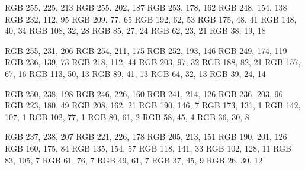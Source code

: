 

\definecolor{red-50}  {RGB} {255, 225, 213}
\definecolor{red-100} {RGB} {255, 202, 187}
\definecolor{red-150} {RGB} {253, 178, 162}
\definecolor{red-200} {RGB} {248, 154, 138}
\definecolor{red-300} {RGB} {232, 112, 95}
\definecolor{red-400} {RGB} {209, 77, 65}
\definecolor{red-500} {RGB} {192, 62, 53}
\definecolor{red-600} {RGB} {175, 48, 41}
\definecolor{red-700} {RGB} {148, 40, 34}
\definecolor{red-800} {RGB} {108, 32, 28}
\definecolor{red-850} {RGB} {85, 27, 24}
\definecolor{red-900} {RGB} {62, 23, 21}
\definecolor{red-950} {RGB} {38, 19, 18}

\definecolor{orange-50}  {RGB} {255, 231, 206}
\definecolor{orange-100} {RGB} {254, 211, 175}
\definecolor{orange-150} {RGB} {252, 193, 146}
\definecolor{orange-200} {RGB} {249, 174, 119}
\definecolor{orange-300} {RGB} {236, 139, 73}
\definecolor{orange-400} {RGB} {218, 112, 44}
\definecolor{orange-500} {RGB} {203, 97, 32}
\definecolor{orange-600} {RGB} {188, 82, 21}
\definecolor{orange-700} {RGB} {157, 67, 16}
\definecolor{orange-800} {RGB} {113, 50, 13}
\definecolor{orange-850} {RGB} {89, 41, 13}
\definecolor{orange-900} {RGB} {64, 32, 13}
\definecolor{orange-950} {RGB} {39, 24, 14}

\definecolor{yellow-50}  {RGB} {250, 238, 198}
\definecolor{yellow-100} {RGB} {246, 226, 160}
\definecolor{yellow-150} {RGB} {241, 214, 126}
\definecolor{yellow-200} {RGB} {236, 203, 96}
\definecolor{yellow-300} {RGB} {223, 180, 49}
\definecolor{yellow-400} {RGB} {208, 162, 21}
\definecolor{yellow-500} {RGB} {190, 146, 7}
\definecolor{yellow-600} {RGB} {173, 131, 1}
\definecolor{yellow-700} {RGB} {142, 107, 1}
\definecolor{yellow-800} {RGB} {102, 77, 1}
\definecolor{yellow-850} {RGB} {80, 61, 2}
\definecolor{yellow-900} {RGB} {58, 45, 4}
\definecolor{yellow-950} {RGB} {36, 30, 8}

\definecolor{green-50}  {RGB} {237, 238, 207}
\definecolor{green-100} {RGB} {221, 226, 178}
\definecolor{green-150} {RGB} {205, 213, 151}
\definecolor{green-200} {RGB} {190, 201, 126}
\definecolor{green-300} {RGB} {160, 175, 84}
\definecolor{green-400} {RGB} {135, 154, 57}
\definecolor{green-500} {RGB} {118, 141, 33}
\definecolor{green-600} {RGB} {102, 128, 11}
\definecolor{green-700} {RGB} {83, 105, 7}
\definecolor{green-800} {RGB} {61, 76, 7}
\definecolor{green-850} {RGB} {49, 61, 7}
\definecolor{green-900} {RGB} {37, 45, 9}
\definecolor{green-950} {RGB} {26, 30, 12}

